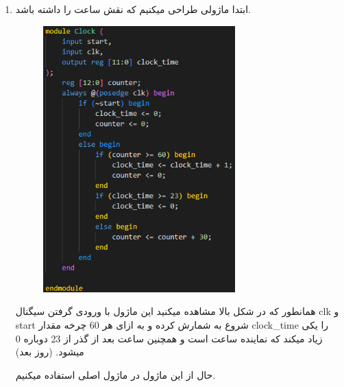 \documentclass{article}
\begin{document}
\begin{enumerate}[label=\textbf{\alph*)}]
    \item ابتدا ماژولی طراحی میکنیم که نقش ساعت را داشته باشد.
    \begin{figure}[H]
        \centering
        \includegraphics[width=0.7\textwidth]{Clock.png}
    \end{figure}
    همانطور که در شکل بالا مشاهده میکنید این ماژول با ورودی گرفتن سیگنال 
    clk
    و
    start
    شروع به شمارش کرده و به ازای هر 60 چرخه مقدار 
    clock\_time
    را یکی زیاد میکند که نماینده ساعت است و همچنین ساعت بعد از گذر از 23 دوباره 0 میشود.
    (روز بعد)

    حال از این ماژول در ماژول اصلی استفاده میکنیم.


\end{enumerate}
\end{document}
